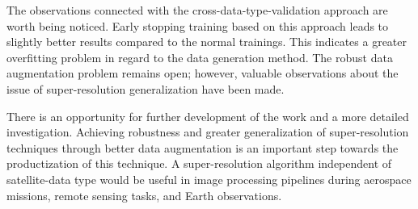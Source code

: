 The observations connected with the cross-data-type-validation approach are worth being noticed.
Early stopping training based on this approach leads to slightly better results compared to the normal trainings.
This indicates a greater overfitting problem in regard to the data generation method.
The robust data augmentation problem remains open; however, valuable observations about the issue of super-resolution generalization have been made.

There is an opportunity for further development of the work and a more detailed investigation.
Achieving robustness and greater generalization of super-resolution techniques through better data augmentation is an important step towards the productization of this technique.
A super-resolution algorithm independent of satellite-data type would be useful in image processing pipelines during aerospace missions, remote sensing tasks, and Earth observations.

